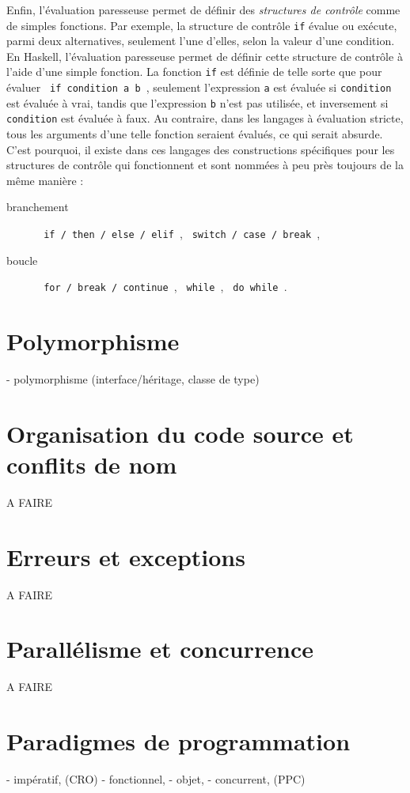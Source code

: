 \documentclass[a4paper,francais]{insalyon}
\begin{document}
Enfin, l'évaluation paresseuse permet de définir des \emph{structures de contrôle} comme de simples fonctions. Par exemple, la structure de contrôle \texttt{if} évalue ou exécute, parmi deux alternatives, seulement l'une d'elles, selon la valeur d'une condition. En Haskell, l'évaluation paresseuse permet de définir cette structure de contrôle à l'aide d'une simple fonction. La fonction \texttt{if} est définie de telle sorte que pour évaluer \verb! if condition a b !, seulement l'expression \texttt{a} est évaluée si \texttt{condition} est évaluée à vrai, tandis que l'expression \texttt{b} n'est pas utilisée, et inversement si \texttt{condition} est évaluée à faux. Au contraire, dans les langages à évaluation stricte, tous les arguments d'une telle fonction seraient évalués, ce qui serait absurde. C'est pourquoi, il existe dans ces langages des constructions spécifiques pour les structures de contrôle qui fonctionnent et sont nommées à peu près toujours de la même manière :
\begin{description}
\item[branchement] \verb! if / then / else / elif !, \verb! switch / case / break !, 
\item[boucle] \verb! for / break / continue !, \verb! while !, \verb! do while !.
\end{description}

\section{Polymorphisme}

- polymorphisme (interface/héritage, classe de type)

\section{Organisation du code source et conflits de nom}

A FAIRE

\section{Erreurs et exceptions}

A FAIRE

\section{Parallélisme et concurrence}

A FAIRE

\section{Paradigmes de programmation}

- impératif, (CRO)
- fonctionnel, 
- objet, 
- concurrent, (PPC)



\end{document}
